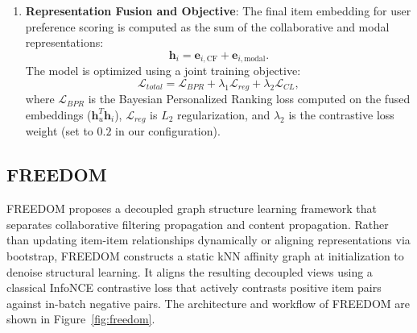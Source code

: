 \begin{enumerate}
    \begin{equation}
        \mathbf{\Theta}_{target} \leftarrow m \mathbf{\Theta}_{target} + (1 - m) \mathbf{\Theta}_{online},
    \end{equation}
    where $m = 0.995$ is the momentum parameter, and gradients are not backpropagated through the target branch. The bootstrap loss evaluates the cosine similarity between the online and target representations:
    \begin{equation}
        \mathcal{L}_{boot}(\mathbf{p}, \mathbf{z}) = 2 - 2 \frac{\mathbf{p}^T \mathbf{z}}{\|\mathbf{p}\| \|\mathbf{z}\|}.
    \end{equation}
    The self-supervised contrastive objective is formulated as:
    \begin{equation}
        \mathcal{L}_{CL} = \frac{1}{2} \left[ \mathcal{L}_{boot}(q(\mathbf{e}_{i, \text{CF}}), sg(\mathbf{e}_{i, \text{modal}})) + \mathcal{L}_{boot}(q(\mathbf{e}_{i, \text{modal}}), sg(\mathbf{e}_{i, \text{target}})) \right],
    \end{equation}
    where $sg(\cdot)$ is the stop-gradient operator.
    \item \textbf{Representation Fusion and Objective}: The final item embedding for user preference scoring is computed as the sum of the collaborative and modal representations:
    \begin{equation}
        \mathbf{h}_i = \mathbf{e}_{i, \text{CF}} + \mathbf{e}_{i, \text{modal}}.
    \end{equation}
    The model is optimized using a joint training objective:
    \begin{equation}
        \mathcal{L}_{total} = \mathcal{L}_{BPR} + \lambda_1 \mathcal{L}_{reg} + \lambda_2 \mathcal{L}_{CL},
    \end{equation}
    where $\mathcal{L}_{BPR}$ is the Bayesian Personalized Ranking loss computed on the fused embeddings ($\mathbf{h}_u^T \mathbf{h}_i$), $\mathcal{L}_{reg}$ is $L_2$ regularization, and $\lambda_2$ is the contrastive loss weight (set to $0.2$ in our configuration).
\end{enumerate}

\subsection{FREEDOM}

FREEDOM \parencite{Zhou_2023} proposes a decoupled graph structure learning framework that separates collaborative filtering propagation and content propagation. Rather than updating item-item relationships dynamically or aligning representations via bootstrap, FREEDOM constructs a static kNN affinity graph at initialization to denoise structural learning. It aligns the resulting decoupled views using a classical InfoNCE contrastive loss that actively contrasts positive item pairs against in-batch negative pairs. The architecture and workflow of FREEDOM are shown in Figure~\ref{fig:freedom}.

